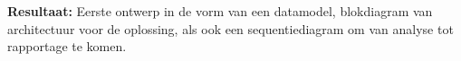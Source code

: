 \textbf{Resultaat:} Eerste ontwerp in de vorm van een datamodel, blokdiagram van architectuur voor de oplossing, als ook een sequentiediagram om van analyse tot rapportage te komen.
%
%
%
%
